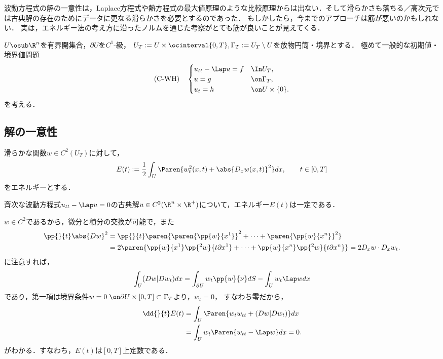 \documentclass[uplatex,dvipdfmx]{jsreport}
\begin{document}
\begin{tcolorbox}[colframe=ForestGreen, colback=ForestGreen!10!white,breakable,colbacktitle=ForestGreen!40!white,coltitle=black,fonttitle=\bfseries\sffamily,
title=]
    波動方程式の解の一意性は，Laplace方程式や熱方程式の最大値原理のような比較原理からは出ない．そして滑らかさも落ちる／高次元では古典解の存在のためにデータに更なる滑らかさを必要とするのであった．
    もしかしたら，今までのアプローチは筋が悪いのかもしれない．
    実は，エネルギー法の考え方に沿ったノルムを通じた考察がとても筋が良いことが見えてくる．
\end{tcolorbox}

\begin{problem}
    $U\osub\R^n$を有界開集合，$\partial U$を$C^1$-級，
    $U_T:=U\times\ocinterval{0,T},\Gamma_T:=U_T\setminus U$を放物円筒・境界とする．
    極めて一般的な初期値・境界値問題
    \[\text{(C-WH)}\quad\begin{cases}
        u_{tt}-\Lap u=f&\In U_T,\\
        u=g&\on \Gamma_T,\\
        u_t=h&\on U\times\{0\}.
    \end{cases}\]
    を考える．
\end{problem}

\subsection{解の一意性}

\begin{definition}[energy]
    滑らかな関数$w\in C^2(U_T)$に対して，
    \[E(t):=\frac{1}{2}\int_U\Paren{w_t^2(x,t)+\abs{D_xw(x,t)}^2}dx,\qquad t\in[0,T]\]
    をエネルギーとする．
\end{definition}

\begin{lemma}[エネルギー保存則]
    斉次な波動方程式$u_{tt}-\Lap u=0$の古典解$u\in C^2(\R^n\times\R^+)$について，エネルギー$E(t)$は一定である．
\end{lemma}
\begin{Proof}
    $w\in C^2$であるから，微分と積分の交換が可能で，また
        \begin{align*}
            \pp{}{t}\abs{Dw}^2&=\pp{}{t}\paren{\paren{\pp{w}{x^1}}^2+\cdots+\paren{\pp{w}{x^n}}^2}\\
            &=2\paren{\pp{w}{x^1}\pp{^2w}{t\partial x^1}+\cdots+\pp{w}{x^n}\pp{^2w}{t\partial x^n}}=2D_xw\cdot D_xw_t.
        \end{align*}
        に注意すれば，
        \[\int_U(Dw|Dw_t)dx=\int_{\partial U}w_t\pp{w}{\nu}dS-\int_Uw_t\Lap wdx\]
        であり，第一項は境界条件$w=0\;\on\partial U\times[0,T]\subset\Gamma_T$より，$w_t=0$，
        すなわち零だから，
        \begin{align*}
            \dd{}{t}E(t)&=\int_U\Paren{w_tw_{tt}+(Dw|Dw_t)}dx\\
            &=\int_Uw_t\Paren{w_{tt}-\Lap w}dx=0.
        \end{align*}
        がわかる．すなわち，$E(t)$は$[0,T]$上定数である．
\end{Proof}
\end{document}
